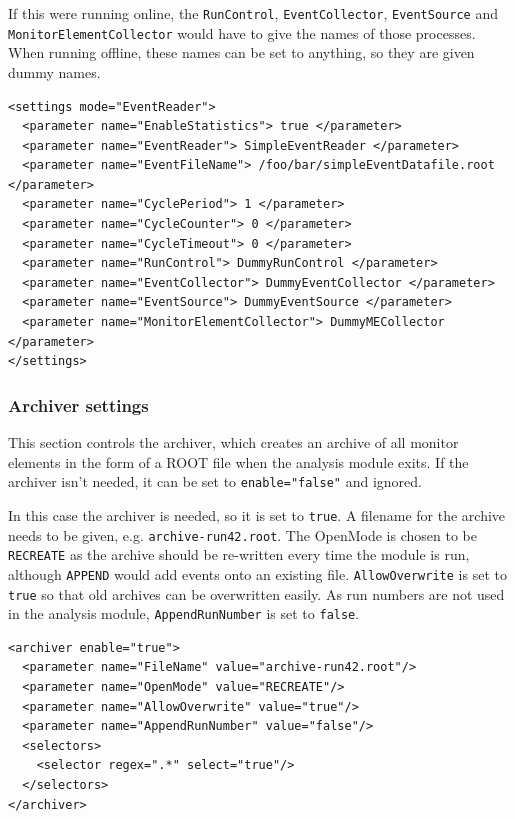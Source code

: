 If this were running online, the \texttt{RunControl}, \texttt{EventCollector}, \texttt{EventSource} and \texttt{MonitorElementCollector} would have to give the names of those processes. When running offline, these names can be set to anything, so they are given dummy names.

\begin{lstlisting}
<settings mode="EventReader">
  <parameter name="EnableStatistics"> true </parameter>
  <parameter name="EventReader"> SimpleEventReader </parameter>
  <parameter name="EventFileName"> /foo/bar/simpleEventDatafile.root </parameter>
  <parameter name="CyclePeriod"> 1 </parameter>
  <parameter name="CycleCounter"> 0 </parameter>
  <parameter name="CycleTimeout"> 0 </parameter>
  <parameter name="RunControl"> DummyRunControl </parameter>
  <parameter name="EventCollector"> DummyEventCollector </parameter>
  <parameter name="EventSource"> DummyEventSource </parameter>
  <parameter name="MonitorElementCollector"> DummyMECollector </parameter>
</settings>
\end{lstlisting}

\subsubsection{Archiver settings}
This section controls the archiver, which creates an archive of all monitor elements in the form of a ROOT file when the analysis module exits. If the archiver isn't needed, it can be set to \texttt{enable="false"} and ignored.

In this case the archiver is needed, so it is set to \texttt{true}. A filename for the archive needs to be given, e.g. \texttt{archive-run42.root}. The OpenMode is chosen to be \texttt{RECREATE} as the archive should be re-written every time the module is run, although \texttt{APPEND} would add events onto an existing file. \texttt{AllowOverwrite} is set to \texttt{true} so that old archives can be overwritten easily. As run numbers are not used in the analysis module, \texttt{AppendRunNumber} is set to \texttt{false}.

\begin{lstlisting}
<archiver enable="true">
  <parameter name="FileName" value="archive-run42.root"/>
  <parameter name="OpenMode" value="RECREATE"/>
  <parameter name="AllowOverwrite" value="true"/>
  <parameter name="AppendRunNumber" value="false"/>
  <selectors>
    <selector regex=".*" select="true"/>
  </selectors>
</archiver>
\end{lstlisting}

